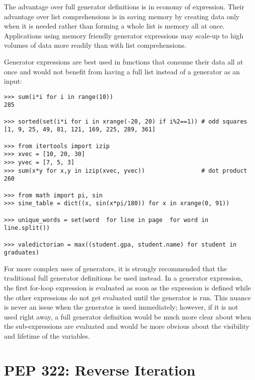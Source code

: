 \documentclass{howto}
\begin{document}
The advantage over full generator definitions is in economy of
expression.  Their advantage over list comprehensions is in saving
memory by creating data only when it is needed rather than forming
a whole list is memory all at once.  Applications using memory
friendly generator expressions may scale-up to high volumes of data
more readily than with list comprehensions.

Generator expressions are best used in functions that consume their
data all at once and would not benefit from having a full list instead
of a generator as an input:

\begin{verbatim}
>>> sum(i*i for i in range(10))
285

>>> sorted(set(i*i for i in xrange(-20, 20) if i%2==1)) # odd squares
[1, 9, 25, 49, 81, 121, 169, 225, 289, 361]

>>> from itertools import izip
>>> xvec = [10, 20, 30]
>>> yvec = [7, 5, 3]
>>> sum(x*y for x,y in izip(xvec, yvec))                # dot product
260

>>> from math import pi, sin
>>> sine_table = dict((x, sin(x*pi/180)) for x in xrange(0, 91))

>>> unique_words = set(word  for line in page  for word in line.split())

>>> valedictorian = max((student.gpa, student.name) for student in graduates)

\end{verbatim}     

For more complex uses of generators, it is strongly recommended that
the traditional full generator definitions be used instead.  In a
generator expression, the first for-loop expression is evaluated
as soon as the expression is defined while the other expressions do
not get evaluated until the generator is run.  This nuance is never
an issue when the generator is used immediately; however, if it is not
used right away, a full generator definition would be much more clear
about when the sub-expressions are evaluated and would be more obvious
about the visibility and lifetime of the variables.

\begin{seealso}
\end{seealso}

\section{PEP 322: Reverse Iteration}
\end{document}
